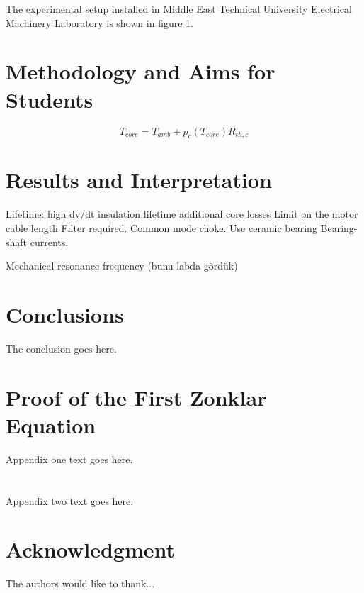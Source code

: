 \documentclass[journal]{IEEEtran}
\begin{document}
The experimental setup installed in Middle East Technical University Electrical Machinery Laboratory is shown in figure 1.


\section{Methodology and Aims for Students}

\begin{equation}
\label{eq4}
T_{core} = T_{amb}+p_{c}(T_{core})R_{th,c}
\end{equation}


\section{Results and Interpretation}

Lifetime: high dv/dt
insulation lifetime
additional core losses
Limit on the motor cable length
Filter required. Common mode choke. Use ceramic bearing
Bearing-shaft currents.

Mechanical resonance frequency (bunu labda gördük)


\section{Conclusions}
The conclusion goes here.


\appendices
\section{Proof of the First Zonklar Equation}
Appendix one text goes here.

\section{}
Appendix two text goes here.


\section*{Acknowledgment}


The authors would like to thank...


\ifCLASSOPTIONcaptionsoff
  \newpage
\fi
\end{document}
